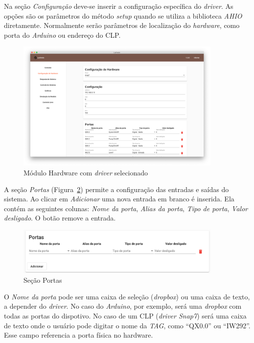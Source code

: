 Na seção \textit{Configuração} deve-se inserir a configuração específica do
\textit{driver}. As opções são os parâmetros do método \textit{setup} quando se
utiliza a biblioteca \textit{AHIO} diretamente. Normalmente serão parâmetros de
localização do \textit{hardware}, como porta do \textit{Arduino} ou endereço do
CLP\@.

\begin{figure}[ht!]
    \centering
    \includegraphics[width=0.9\textwidth]{imgs/hardware2}
    \caption[Módulo Hardware com driver selecionado]{Módulo Hardware com \textit{driver} selecionado}%
    \label{fig:hardware2}
\end{figure}

A seção \textit{Portas} (Figura~\ref{fig:hardware3}) permite a configuração das
entradas e saídas do sistema. Ao clicar em \textit{Adicionar} uma nova entrada
em branco é inserida. Ela contém as seguintes colunas: \textit{Nome da porta},
\textit{Alias da porta}, \textit{Tipo de porta}, \textit{Valor desligado}. O
botão  remove a entrada.

\begin{figure}[ht!]
    \centering
    \includegraphics[width=0.9\textwidth]{imgs/hardware3}
    \caption[Seção Portas]{Seção Portas}%
    \label{fig:hardware3}
\end{figure}

O \textit{Nome da porta} pode ser uma caixa de seleção (\textit{dropbox}) ou uma
caixa de texto, a depender do \textit{driver}. No caso do \textit{Arduino}, por
exemplo, será uma \textit{dropbox} com todas as portas do dispotivo. No caso de
um CLP (\textit{driver Snap7}) será uma caixa de texto onde o usuário pode
digitar o nome da \textit{TAG}, como \enquote{QX0.0} ou \enquote{IW292}. Esse
campo referencia a porta física no hardware.

